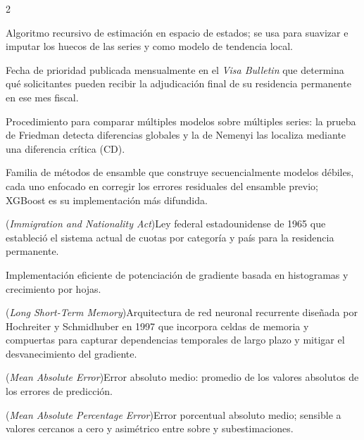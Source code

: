 \documentclass[12pt,letterpaper]{report}
\begin{document}
\begin{multicols}{2}
\begin{description}[leftmargin=0pt, labelindent=0pt, itemindent=0pt,
                    labelsep=0.4em, font=\bfseries\scriptsize,
                    itemsep=1pt, parsep=0pt, topsep=0pt]
    \item[Filtro de Kalman] Algoritmo recursivo de estimación en espacio de estados; se usa para suavizar e imputar los huecos de las series y como modelo de tendencia local.

    \item[Final Action Dates] Fecha de prioridad publicada mensualmente en el \textit{Visa Bulletin} que determina qué solicitantes pueden recibir la adjudicación final de su residencia permanente en ese mes fiscal.

    \item[Friedman-Nemenyi (pruebas)] Procedimiento para comparar múltiples modelos sobre múltiples series: la prueba de Friedman detecta diferencias globales y la de Nemenyi las localiza mediante una diferencia crítica (CD).

    \item[Gradient Boosting] Familia de métodos de ensamble que construye secuencialmente modelos débiles, cada uno enfocado en corregir los errores residuales del ensamble previo; XGBoost es su implementación más difundida.

    \item[INA] (\textit{Immigration and Nationality Act})\hspace{0.3em}Ley federal estadounidense de 1965 que estableció el sistema actual de cuotas por categoría y país para la residencia permanente.

    \item[LightGBM] Implementación eficiente de potenciación de gradiente basada en histogramas y crecimiento por hojas.

    \item[LSTM] (\textit{Long Short-Term Memory})\hspace{0.3em}Arquitectura de red neuronal recurrente diseñada por Hochreiter y Schmidhuber en 1997 que incorpora celdas de memoria y compuertas para capturar dependencias temporales de largo plazo y mitigar el desvanecimiento del gradiente.

    \item[MAE] (\textit{Mean Absolute Error})\hspace{0.3em}Error absoluto medio: promedio de los valores absolutos de los errores de predicción.

    \item[MAPE] (\textit{Mean Absolute Percentage Error})\hspace{0.3em}Error porcentual absoluto medio; sensible a valores cercanos a cero y asimétrico entre sobre y subestimaciones.


\end{description}
\end{multicols}
\end{document}
